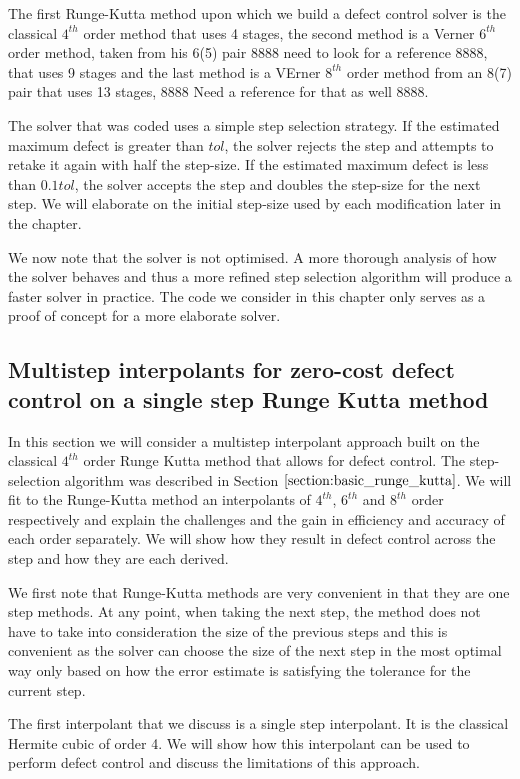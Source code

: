 \documentclass{article}
\begin{document}
The first Runge-Kutta method upon which we build a defect control solver is the classical $4^{th}$ order method that uses 4 stages, the second method is a Verner $6^{th}$ order method, taken from his 6(5) pair 8888 need to look for a reference 8888, that uses 9 stages and the last method is a VErner $8^{th}$ order method from an 8(7) pair that uses 13 stages, 8888 Need a reference for that as well 8888. 

The solver that was coded uses a simple step selection strategy. If the estimated maximum defect is greater than $tol$, the solver rejects the step and attempts to retake it again with half the step-size. If the estimated maximum defect is less than $0.1tol$, the solver accepts the step and doubles the step-size for the next step. We will elaborate on the initial step-size used by each modification later in the chapter.

We now note that the solver is not optimised. A more thorough analysis of how the solver behaves and thus a more refined step selection algorithm will produce a faster solver in practice. The code we consider in this chapter only serves as a proof of concept for a more elaborate solver. 

\subsection{Multistep interpolants for zero-cost defect control on a single step Runge Kutta method}
\label{section:equipping_rk4_with_HBs}
In this section we will consider a multistep interpolant approach built on the classical $4^{th}$ order Runge Kutta method that allows for defect control. The step-selection algorithm was described in Section $\ref{section:basic_runge_kutta}$. We will fit to the Runge-Kutta method an interpolants of $4^{th}$, $6^{th}$ and $8^{th}$ order respectively and explain the challenges and the gain in efficiency and accuracy of each order separately. We will show how they result in defect control across the step and how they are each derived.

We first note that Runge-Kutta methods are very convenient in that they are one step methods. At any point, when taking the next step, the method does not have to take into consideration the size of the previous steps and this is convenient as the solver can choose the size of the next step in the most optimal way only based on how the error estimate is satisfying the tolerance for the current step. 

The first interpolant that we discuss is a single step interpolant. It is the classical Hermite cubic of order 4. We will show how this interpolant can be used to perform defect control and discuss the limitations of this approach. 
\end{document}
